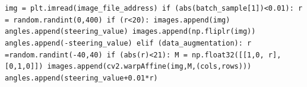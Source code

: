 \documentclass[12pt,a4paper]{article}
\begin{document}
	\texttt{img = plt.imread(image\_file\_address) \newline
		if (abs(batch\_sample[1])<0.01):\newline
		\hspace*{0.5cm} r = random.randint(0,400)\newline
		\hspace*{0.5cm} if (r<20):\newline
		\hspace*{1.0cm} images.append(img)\newline
		\hspace*{1.0cm} angles.append(steering\_value)\newline
		\hspace*{1.0cm} images.append(np.fliplr(img))\newline
		\hspace*{1.0cm} angles.append(-steering\_value)\newline
		\hspace*{0.5cm} elif (data\_augmentation):\newline
		\hspace*{1.0cm} r =random.randint(-40,40)\newline
		\hspace*{1.0cm} 
		\hspace*{1.0cm} if (abs(r)<21):\newline
		\hspace*{1.5cm} M = np.float32([[1,0, r],[0,1,0]])\newline
		\hspace*{1.5cm}  images.append(cv2.warpAffine(img,M,(cols,rows)))\newline
		\hspace*{1.5cm} angles.append(steering\_value+0.01*r)}
	
\end{document}

